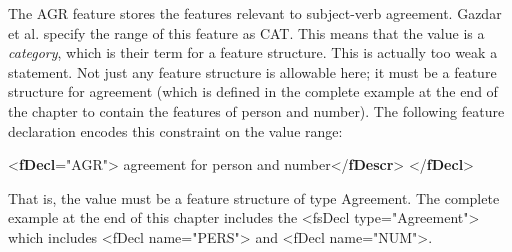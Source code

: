 The AGR feature stores the features relevant to subject-verb agreement. Gazdar et al. specify the range of this feature as CAT. This means that the value is a \textit{category}, which is their term for a feature structure. This is actually too weak a statement. Not just any feature structure is allowable here; it must be a feature structure for agreement (which is defined in the complete example at the end of the chapter to contain the features of person and number). The following feature declaration encodes this constraint on the value range: \par\bgroup{}\exampleFont \begin{shaded}\noindent\mbox{}{<\textbf{fDecl}\hspace*{1em}{name}="{AGR}">}\mbox{}\newline 
{}agreement for person and number{</\textbf{fDescr}>}\mbox{}\newline 
{}\mbox{}\newline 
\hspace*{1em}\mbox{}\newline 
{}\mbox{}\newline 
{</\textbf{fDecl}>}\end{shaded}\egroup\par \noindent  That is, the value must be a feature structure of type Agreement. The complete example at the end of this chapter includes the <fsDecl type="Agreement"> which includes <fDecl name="PERS"> and <fDecl name="NUM">.\par
